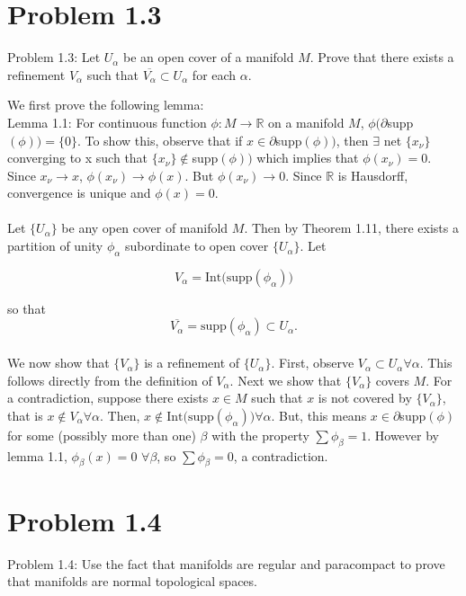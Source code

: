 \documentclass[paper=a4, fontsize=11pt]{scrartcl} %
\numberwithin{equation}{section} %
\numberwithin{figure}{section} %
\numberwithin{table}{section} %
\begin{document}
\section*{Problem 1.3}

Problem 1.3: Let ${U_\alpha}$ be an open cover of a manifold $M$. Prove that there exists a refinement ${V_{\alpha}}$ such that $\overline{V_{\alpha}} \subset U_{\alpha}$ for each $\alpha$. 

We first prove the following lemma: \\

Lemma 1.1: For continuous function $\phi: M \to \mathbb{R}$ on a manifold $M$, $\phi(\partial $supp$(\phi)) = \{0\}$. To show this, observe that if $x \in \partial $supp$(\phi))$, then $\exists$ net $\{x_{\nu}\} $ converging to x such that $\{x_{\nu}\} \not \in $supp$(\phi))$ which implies that $\phi(x_{\nu}) = 0$. Since $x_{\nu} \to x$, $\phi(x_{\nu}) \to \phi(x)$. But $\phi(x_{\nu}) \to 0$. Since $\mathbb{R}$ is Hausdorff, convergence is unique and $\phi(x) = 0$.
\\ \\
Let $\{U_{\alpha}\}$ be any open cover of manifold $M$. Then by Theorem 1.11, there exists a partition of unity $\phi_{\alpha}$ subordinate to open cover $\{U_{\alpha}\}$. Let 

\[V_{\alpha} = \textrm{Int(supp}(\phi_{\alpha}))\]

 so that \[
\overline{V_{\alpha}} = \textrm{supp}(\phi_{\alpha}) \subset U_{\alpha}.
\]
\\

We now show that $\{V_{\alpha}\}$ is a refinement of $\{U_{\alpha}\}$. First, observe $V_{\alpha} \subset U_{\alpha} \forall \alpha$. This follows directly from the definition of $V_{\alpha}$. Next we show that $\{V_{\alpha}\}$ covers $M$. For a contradiction, suppose there exists $x \in M$ such that $x$ is not covered by $\{V_{\alpha}\}$, that is $x \not \in V_{\alpha} \forall \alpha$. Then, $x \not \in \textrm{Int(supp}(\phi_{\alpha}))\forall \alpha$. But, this means $x \in \partial $supp$(\phi) $ for some (possibly more than one) $\beta$ with the property $\sum \phi_{\beta} = 1$. However by lemma 1.1, $\phi_{\beta} (x) = 0$  $\forall \beta $, so $\sum \phi_{\beta} = 0$, a contradiction.

\section*{Problem 1.4}

Problem 1.4: Use the fact that manifolds are regular and paracompact to prove that manifolds are normal topological spaces.\\
\end{document}
